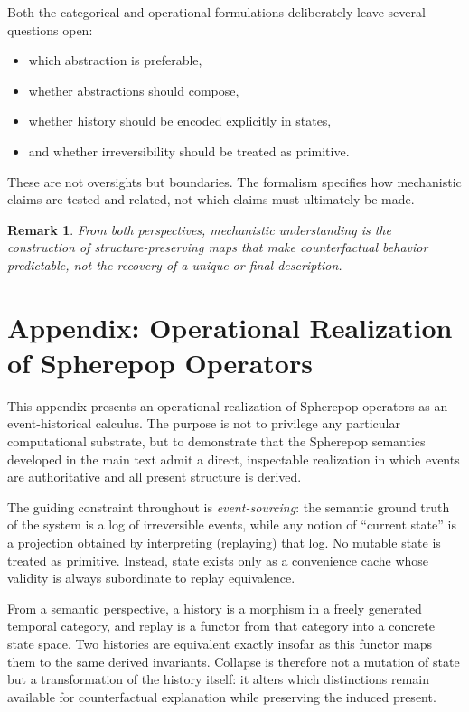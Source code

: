 \documentclass[11pt]{article}
\newtheorem{remark}{Remark}
\begin{document}
Both the categorical and operational formulations deliberately leave several questions open:
\begin{itemize}
\item which abstraction is preferable,
\item whether abstractions should compose,
\item whether history should be encoded explicitly in states,
\item and whether irreversibility should be treated as primitive.
\end{itemize}

These are not oversights but boundaries. The formalism specifies how mechanistic claims are tested and related, not which claims must ultimately be made.

\begin{remark}
From both perspectives, mechanistic understanding is the construction of structure-preserving maps that make counterfactual behavior predictable, not the recovery of a unique or final description.
\end{remark}

\appendix
\section{Appendix: Operational Realization of Spherepop Operators}

This appendix presents an operational realization of Spherepop operators as an
event-historical calculus. The purpose is not to privilege any particular
computational substrate, but to demonstrate that the Spherepop semantics
developed in the main text admit a direct, inspectable realization in which
events are authoritative and all present structure is derived.

The guiding constraint throughout is \emph{event-sourcing}: the semantic ground
truth of the system is a log of irreversible events, while any notion of
``current state'' is a projection obtained by interpreting (replaying) that log.
No mutable state is treated as primitive. Instead, state exists only as a
convenience cache whose validity is always subordinate to replay equivalence.

From a semantic perspective, a history is a morphism in a freely generated
temporal category, and replay is a functor from that category into a concrete
state space. Two histories are equivalent exactly insofar as this functor maps
them to the same derived invariants. Collapse is therefore not a mutation of
state but a transformation of the history itself: it alters which distinctions
remain available for counterfactual explanation while preserving the induced
present.
\end{document}
